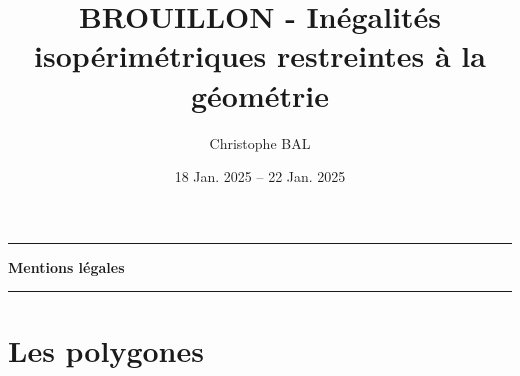 \documentclass[12pt]{amsart}
\begin{document}
\title{BROUILLON - Inégalités isopérimétriques restreintes à la géométrie}
\author{Christophe BAL}
\date{18 Jan. 2025 -- 22 Jan. 2025}
\maketitle


\begin{center}
	\hrule\vspace{.3em}
	{
		\fontsize{1.35em}{1em}\selectfont
		\textbf{Mentions \og légales \fg}
	}
			
	\vspace{0.45em}
	\doclicenseThis
	\hrule
\end{center}



\setcounter{tocdepth}{2}
\tableofcontents




\newpage

%
%
%
%
%
%
%
%
%
%
%
%
%
%
%
%
%
%
%
%
%
%
%
%
%
%
%
%
%
%
%
%
%
%
%

\section{Les polygones}


\end{document}

